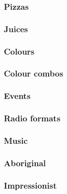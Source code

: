 \documentclass[11pt,letter]{article}
\begin{document}


\subsubsection{Pizzas}



\subsubsection{Juices}



\subsubsection{Colours}



\subsubsection{Colour combos}



\subsubsection{Events}



\subsubsection{Radio formats}



\subsubsection{Music}



\subsubsection{Aboriginal}



\subsubsection{Impressionist}
\end{document}
